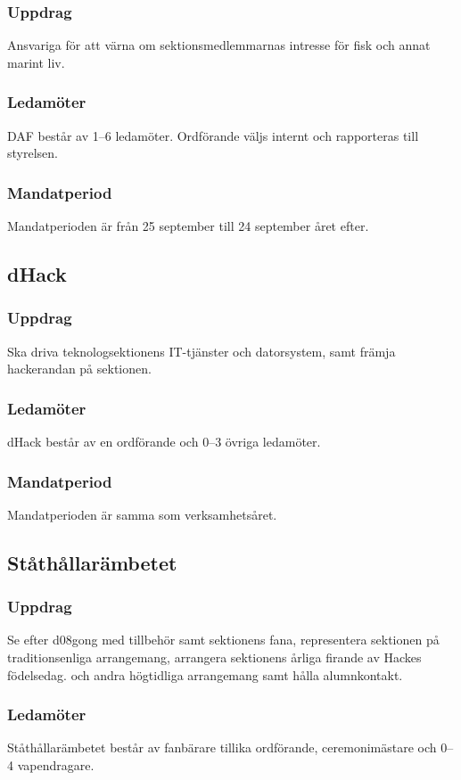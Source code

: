 \subsubsection{Uppdrag}
Ansvariga för att värna om sektionsmedlemmarnas intresse för fisk och
annat marint liv.
\subsubsection{Ledamöter}
DAF består av 1--6 ledamöter. Ordförande väljs internt och rapporteras till styrelsen.
\subsubsection{Mandatperiod}
Mandatperioden är från 25 september till 24 september året efter.

\subsection{dHack}
\subsubsection{Uppdrag}
Ska driva teknologsektionens IT-tjänster och datorsystem, samt
främja hackerandan på sektionen.
\subsubsection{Ledamöter}
dHack består av en ordförande och 0--3 övriga ledamöter.
\subsubsection{Mandatperiod}
Mandatperioden är samma som verksamhetsåret.

\subsection{Ståthållarämbetet}
\subsubsection{Uppdrag}
Se efter d08gong med tillbehör samt sektionens fana, representera sektionen på traditionsenliga arrangemang, arrangera sektionens årliga firande av Hackes födelsedag.
och andra högtidliga arrangemang samt hålla alumnkontakt.
\subsubsection{Ledamöter}
  Ståthållarämbetet består av fanbärare tillika ordförande, ceremonimästare och 0--4 vapendragare.
